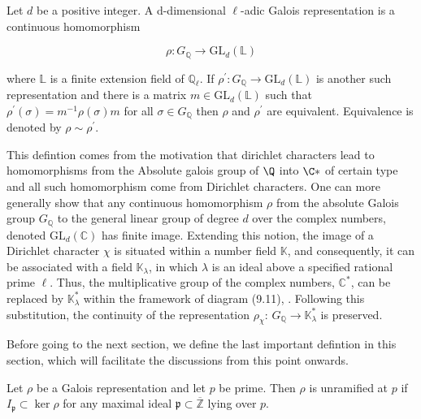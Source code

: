 \begin{definition}
    Let $d$ be a positive integer. A d-dimensional $\ell$-adic Galois representation is a continuous homomorphism

$$
\rho: G_{\mathbb{Q}} \longrightarrow \mathrm{GL}_{d}(\mathbb{L})
$$

where $\mathbb{L}$ is a finite extension field of $\mathbb{Q}_{\ell}$. If $\rho^{\prime}: G_{\mathbb{Q}} \longrightarrow \mathrm{GL}_{d}(\mathbb{L})$ is another such representation and there is a matrix $m \in \mathrm{GL}_{d}(\mathbb{L})$ such that $\rho^{\prime}(\sigma)=m^{-1} \rho(\sigma) m$ for all $\sigma \in G_{\mathbb{Q}}$ then $\rho$ and $\rho^{\prime}$ are equivalent. Equivalence is denoted by $\rho \sim \rho^{\prime}$.
\end{definition}

\begin{remark}
    This defintion comes from the motivation that dirichlet characters lead to homomorphisms from the Absolute galois group of $\Q$ into $\C*$ of certain type and all such homomorphism come from Dirichlet characters. One can more generally show that any continuous homomorphism \( \rho \) from the absolute Galois group \( G_{\mathbb{Q}} \) to the general linear group of degree \( d \) over the complex numbers, denoted \( \mathrm{GL}_{d}(\mathbb{C}) \) has finite image. Extending this notion, the image of a Dirichlet character \( \chi \) is situated within a number field \( \mathbb{K} \), and consequently, it can be associated with a field \( \mathbb{K}_{\lambda} \), in which \( \lambda \) is an ideal above a specified rational prime \( \ell \). Thus, the multiplicative group of the complex numbers, \( \mathbb{C}^{*} \), can be replaced by \( \mathbb{K}_{\lambda}^{*} \) within the framework of diagram (9.11), \cite{diamond2005first}. Following this substitution, the continuity of the representation \( \rho_{\chi} \): \( G_{\mathbb{Q}} \rightarrow \mathbb{K}_{\lambda}^{*} \) is preserved. \\
\end{remark}
Before going to the next section, we define the last important defintion in this section, which will facilitate the discussions from this point onwards. 

\begin{definition}
    Let $\rho$ be a Galois representation and let $p$ be prime. Then $\rho$ is unramified at $p$ if $I_{\mathfrak{p}} \subset \operatorname{ker} \rho$ for any maximal ideal $\mathfrak{p} \subset \overline{\mathbb{Z}}$ lying over $p$.

\end{definition}

